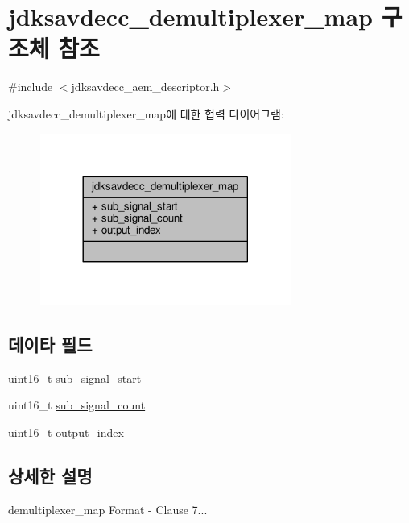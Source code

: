 \hypertarget{structjdksavdecc__demultiplexer__map}{}\section{jdksavdecc\+\_\+demultiplexer\+\_\+map 구조체 참조}
\label{structjdksavdecc__demultiplexer__map}


{\ttfamily \#include $<$jdksavdecc\+\_\+aem\+\_\+descriptor.\+h$>$}



jdksavdecc\+\_\+demultiplexer\+\_\+map에 대한 협력 다이어그램\+:
\nopagebreak
\begin{figure}[H]
\begin{center}
\leavevmode
\includegraphics[width=233pt]{structjdksavdecc__demultiplexer__map__coll__graph}
\end{center}
\end{figure}
\subsection*{데이타 필드}
\begin{DoxyCompactItemize}
\item 
uint16\+\_\+t \hyperlink{structjdksavdecc__demultiplexer__map_a4277ab8f00d35ea7381d919a79324a2f}{sub\+\_\+signal\+\_\+start}
\item 
uint16\+\_\+t \hyperlink{structjdksavdecc__demultiplexer__map_a539ba5ac909f01c2b76e345233d20902}{sub\+\_\+signal\+\_\+count}
\item 
uint16\+\_\+t \hyperlink{structjdksavdecc__demultiplexer__map_a894cb1dd2c8dab6ee5d8e165370fa0a7}{output\+\_\+index}
\end{DoxyCompactItemize}


\subsection{상세한 설명}
demultiplexer\+\_\+map Format -\/ Clause 7... 


